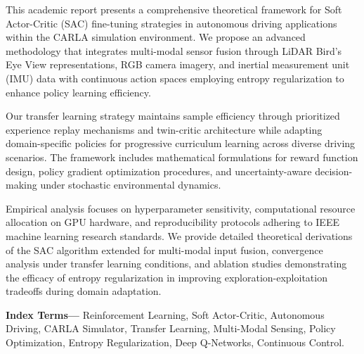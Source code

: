 \documentclass[10pt,a4paper,twocolumn]{article}
\begin{document}
\begin{abstract*}
This academic report presents a comprehensive theoretical framework for Soft Actor-Critic (SAC) fine-tuning strategies in autonomous driving applications within the CARLA simulation environment. We propose an advanced methodology that integrates multi-modal sensor fusion through LiDAR Bird's Eye View representations, RGB camera imagery, and inertial measurement unit (IMU) data with continuous action spaces employing entropy regularization to enhance policy learning efficiency.

Our transfer learning strategy maintains sample efficiency through prioritized experience replay mechanisms and twin-critic architecture while adapting domain-specific policies for progressive curriculum learning across diverse driving scenarios. The framework includes mathematical formulations for reward function design, policy gradient optimization procedures, and uncertainty-aware decision-making under stochastic environmental dynamics.

Empirical analysis focuses on hyperparameter sensitivity, computational resource allocation on GPU hardware, and reproducibility protocols adhering to IEEE machine learning research standards. We provide detailed theoretical derivations of the SAC algorithm extended for multi-modal input fusion, convergence analysis under transfer learning conditions, and ablation studies demonstrating the efficacy of entropy regularization in improving exploration-exploitation tradeoffs during domain adaptation.

\vspace{0.2cm}
\noindent\textbf{Index Terms---} Reinforcement Learning, Soft Actor-Critic, Autonomous Driving, CARLA Simulator, Transfer Learning, Multi-Modal Sensing, Policy Optimization, Entropy Regularization, Deep Q-Networks, Continuous Control.
\end{abstract*}

\vspace{-1em}
\end{document}
